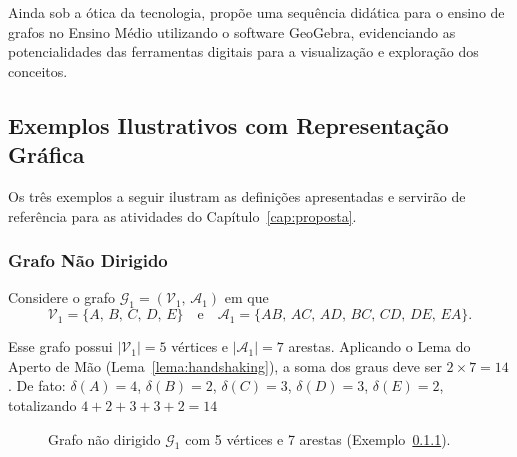 \documentclass[
  12pt,
  oneside,
  a4paper,
  english,
  brazilian
  ]{abntex2}
\theoremstyle{definition}
\def\sffamily{}%
\def\bfseries{}%
\begin{document}
Ainda sob a ótica da tecnologia, \textcite{silva2020} propõe uma sequência didática para o ensino de grafos no Ensino Médio utilizando o software GeoGebra, evidenciando as potencialidades das ferramentas digitais para a visualização e exploração dos conceitos.

\subsection{Exemplos Ilustrativos com Representação Gráfica}

Os três exemplos a seguir ilustram as definições apresentadas e servirão de
referência para as atividades do Capítulo~\ref{cap:proposta}.

\subsubsection{Grafo Não Dirigido}


\label{ex:nao_dirigido}
Considere o grafo $\mathcal{G}_1 = (\mathcal{V}_1,\, \mathcal{A}_1)$ em que
\[
  \mathcal{V}_1 = \{A,\, B,\, C,\, D,\, E\}
  \quad \text{e} \quad
  \mathcal{A}_1 = \{AB,\, AC,\, AD,\, BC,\, CD,\, DE,\, EA\}.
\]

Esse grafo possui $|\mathcal{V}_1| = 5$ vértices e $|\mathcal{A}_1| = 7$
arestas. Aplicando o Lema do Aperto de Mão
(Lema~\ref{lema:handshaking}), a soma dos graus deve ser $2 \times 7 = 14$. De fato: $\delta(A) = 4$, $\delta(B) = 2$, $\delta(C) = 3$, $\delta(D) = 3$,
$\delta(E) = 2$, totalizando $4 + 2 + 3 + 3 + 2 = 14$ \checkmark


\begin{figure}[htb]
  \centering
  \caption{Grafo não dirigido $\mathcal{G}_1$ com 5 vértices e 7 arestas
           (Exemplo~\ref{ex:nao_dirigido}).}
  \label{fig:grafo_nao_dirigido}
\end{figure}
\end{document}

